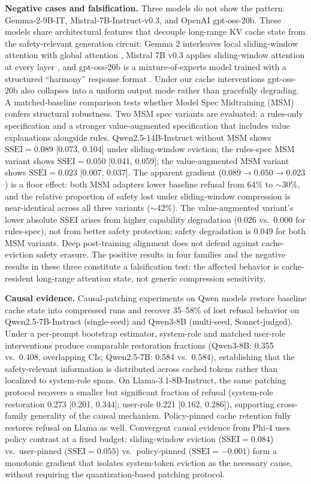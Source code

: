 \documentclass{article}
\newcommand{\ssei}{\mathrm{SSEI}}
\begin{document}
\textbf{Negative cases and falsification.} Three models do not show the pattern: Gemma-2-9B-IT, Mistral-7B-Instruct-v0.3, and OpenAI gpt-oss-20b. These models share architectural features that decouple long-range KV cache state from the safety-relevant generation circuit: Gemma 2 interleaves local sliding-window attention with global attention \citep{team2024gemma}, Mistral 7B v0.3 applies sliding-window attention at every layer \citep{jiang2023mistral}, and gpt-oss-20b is a mixture-of-experts model trained with a structured ``harmony'' response format \citep{openai2025gptoss}. Under our cache interventions gpt-oss-20b also collapses into a uniform output mode rather than gracefully degrading. A matched-baseline comparison tests whether Model Spec Midtraining (MSM) \citep{li2025msm} confers structural robustness. Two MSM spec variants are evaluated: a rules-only specification and a stronger value-augmented specification that includes value explanations alongside rules. Qwen2.5-14B-Instruct without MSM shows $\ssei = 0.089$ [0.073, 0.104] under sliding-window eviction; the rules-spec MSM variant shows $\ssei = 0.050$ [0.041, 0.059]; the value-augmented MSM variant shows $\ssei = 0.023$ [0.007, 0.037]. The apparent gradient ($0.089 \to 0.050 \to 0.023$) is a floor effect: both MSM adapters lower baseline refusal from 64\% to $\sim$30\%, and the relative proportion of safety lost under sliding-window compression is near-identical across all three variants ($\sim$42\%). The value-augmented variant's lower absolute SSEI arises from higher capability degradation (0.026 vs.\ 0.000 for rules-spec), not from better safety protection; safety degradation is 0.049 for both MSM variants. Deep post-training alignment does not defend against cache-eviction safety erasure. The positive results in four families and the negative results in these three constitute a falsification test: the affected behavior is cache-resident long-range attention state, not generic compression sensitivity.

\textbf{Causal evidence.} Causal-patching experiments on Qwen models restore baseline cache state into compressed runs and recover 35--58\% of lost refusal behavior on Qwen2.5-7B-Instruct (single-seed) and Qwen3-8B (multi-seed, Sonnet-judged). Under a per-prompt bootstrap estimator, system-role and matched user-role interventions produce comparable restoration fractions (Qwen3-8B: 0.355 vs.\ 0.408, overlapping CIs; Qwen2.5-7B: 0.584 vs.\ 0.584), establishing that the safety-relevant information is distributed across cached tokens rather than localized to system-role spans. On Llama-3.1-8B-Instruct, the same patching protocol recovers a smaller but significant fraction of refusal (system-role restoration 0.273 [0.201, 0.344]; user-role 0.221 [0.162, 0.286]), supporting cross-family generality of the causal mechanism. Policy-pinned cache retention fully restores refusal on Llama as well. Convergent causal evidence from Phi-4 uses policy contrast at a fixed budget: sliding-window eviction ($\ssei = 0.084$) vs.\ user-pinned ($\ssei = 0.055$) vs.\ policy-pinned ($\ssei = -0.001$) form a monotonic gradient that isolates system-token eviction as the necessary cause, without requiring the quantization-based patching protocol.
\end{document}

